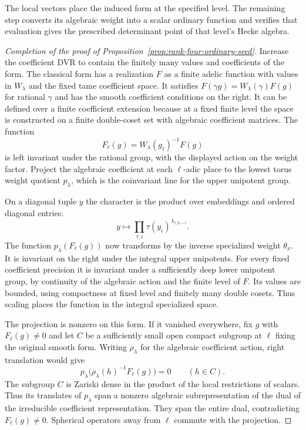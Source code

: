 The local vectors place the induced form at the specified level. The remaining step converts its algebraic weight into a scalar ordinary function and verifies that evaluation gives the prescribed determinant point of that level's Hecke algebra.

\begin{proof}[Completion of the proof of Proposition~\ref{prop:rank-four-ordinary-seed}]
Increase the coefficient DVR to contain the finitely many
values and coefficients of the form. The classical form has
a realization \(F\) as a finite adelic function with values
in \(W_\lambda\) and the fixed tame coefficient space.
It satisfies
\(F(\gamma g)=W_\lambda(\gamma)F(g)\) for rational \(\gamma\)
and has the smooth coefficient conditions on the right. It can
be defined over a finite coefficient extension because at a
fixed finite level the space is constructed on a finite
double-coset set with algebraic coefficient matrices.
The function
\[
                F_\ell(g)=W_\lambda(g_\ell)^{-1}F(g)
\]
is left invariant under the rational group, with the
displayed action on the weight factor. Project the
algebraic coefficient at each \(\ell\)-adic place to
the lowest torus weight quotient \(p_\lambda\), which is
the coinvariant line for the upper unipotent group.

On a diagonal tuple \(y\) the character is the product over embeddings and ordered diagonal entries:
\[
 y\longmapsto\prod_{\tau,i}\tau(y_i)^{\lambda_{\tau,3-i}} .
\]
The function \(p_\lambda(F_\ell(g))\) now transforms by
the inverse specialized weight \(\theta_x\).
It is invariant on the right under the integral upper
unipotents. For every fixed coefficient precision it is
invariant under a sufficiently deep lower unipotent group,
by continuity of the algebraic action and the finite level
of \(F\). Its values are bounded, using compactness at
fixed level and finitely many double cosets. Thus scaling
places the function in the integral specialized space.

The projection is nonzero on this form. If it vanished everywhere, fix \(g\) with \(F_\ell(g)\ne0\)
and let \(C\) be a sufficiently small open compact subgroup
at \(\ell\) fixing the original smooth form. Writing \(\rho_\lambda\)
for the algebraic coefficient action, right translation would give
\[
    p_\lambda\bigl(\rho_\lambda(h)^{-1}F_\ell(g)\bigr)=0
                        \qquad(h\in C).
\]
The subgroup \(C\) is Zariski dense in the product of the local
restrictions of scalars. Thus its translates of \(p_\lambda\)
span a nonzero algebraic subrepresentation of the dual of the
irreducible coefficient representation. They span the entire dual,
contradicting \(F_\ell(g)\ne0\).
Spherical operators away from \(\ell\) commute with the
projection.


\end{proof}
